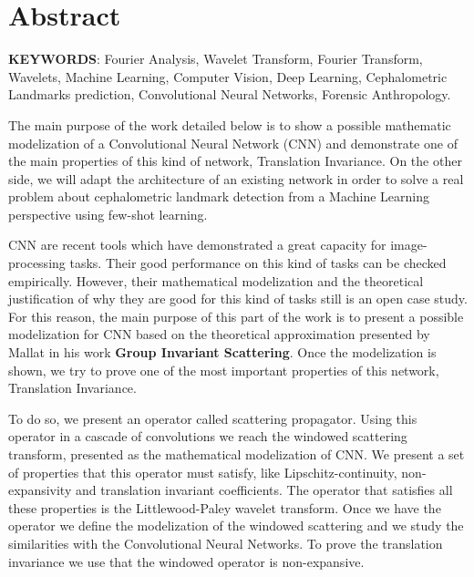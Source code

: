 %

\chapter{Abstract}

\textbf{KEYWORDS}: Fourier Analysis, Wavelet Transform, Fourier Transform, Wavelets, Machine Learning, Computer Vision, Deep Learning, Cephalometric Landmarks prediction, Convolutional Neural Networks, Forensic Anthropology.

\vspace{10mm}

\noindent The main purpose of the work detailed below is to show a possible mathematic modelization of a Convolutional Neural Network (CNN) and demonstrate one of the main properties of this kind of network, Translation Invariance.  On the other side, we will adapt the architecture of an existing network in order to solve a real problem about cephalometric landmark detection from a Machine Learning perspective using few-shot learning.

\medskip

\noindent CNN are recent tools which have demonstrated a great capacity for image-processing tasks. Their good performance on this kind of tasks can be checked empirically. However, their mathematical modelization and the theoretical justification of why they are good for this kind of tasks still is an open case study. For this reason, the main purpose of this part of the work is to present a possible modelization for CNN based on the theoretical approximation presented by Mallat in his work \textbf{Group Invariant Scattering}. Once the modelization is shown, we try to prove one of the most important properties of this network, Translation Invariance.

\medskip

\noindent To do so, we present an operator called scattering propagator. Using this operator in a cascade of convolutions we reach the windowed scattering transform, presented as the mathematical modelization of CNN. We present a set of properties that this operator must satisfy, like Lipschitz-continuity, non-expansivity and translation invariant coefficients. The operator that satisfies all these properties is the Littlewood-Paley wavelet transform. Once we have the operator we define the modelization of the windowed scattering and we study the similarities with the Convolutional Neural Networks. To prove the translation invariance we use that the windowed operator is non-expansive.

